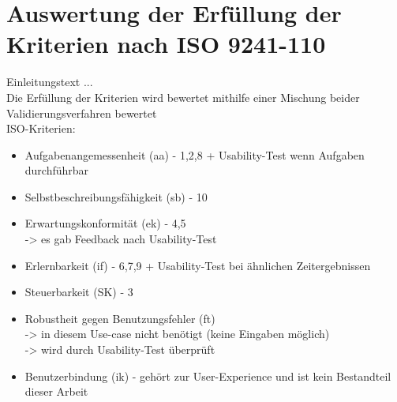 \section{Auswertung der Erfüllung der Kriterien nach ISO 9241-110}
Einleitungstext ...\\
Die Erfüllung der Kriterien wird bewertet mithilfe einer Mischung beider Validierungsverfahren bewertet\\

\noindent
ISO-Kriterien:
\begin{itemize}
    \item Aufgabenangemessenheit (aa) - 1,2,8 + Usability-Test wenn Aufgaben durchführbar
    \item Selbstbeschreibungsfähigkeit (sb) - 10
    \item Erwartungskonformität (ek) - 4,5\\
    -> es gab Feedback nach Usability-Test
    \item Erlernbarkeit (if) - 6,7,9 + Usability-Test bei ähnlichen Zeitergebnissen
    \item Steuerbarkeit (SK) - 3
    \item Robustheit gegen Benutzungsfehler (ft)\\
    -> in diesem Use-case nicht benötigt (keine Eingaben möglich)\\
    -> wird durch Usability-Test überprüft
    \item Benutzerbindung (ik) - gehört zur User-Experience und ist kein Bestandteil dieser Arbeit
\end{itemize}









